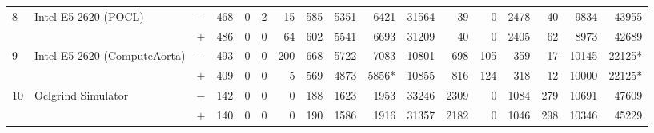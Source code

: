 \begin{tabular}{lll | rrrrrrr | rrrrrrr }
\hline
\multirow{ 2}{*}{8} & \multirow{ 2}{*}{Intel E5-2620 (POCL)} & $-$ & 468 & 0 & 2 & 15 & 585 & 5351 & 6421       & 31564 & 39 & 0 & 2478 & 40 & 9834 & 43955 \\& & $+$ & 486 & 0 & 0 & 64 & 602 & 5541 & 6693 & 31209 & 40 & 0 & 2405 & 62 & 8973 & 42689 \\
\hline
\multirow{ 2}{*}{9} & \multirow{ 2}{*}{Intel E5-2620 (ComputeAorta)} & $-$ & 493 & 0 & 0 & 200 & 668 & 5722 & 7083       & 10801 & 698 & 105 & 359 & 17 & 10145 & 22125* \\& & $+$ & 409 & 0 & 0 & 5 & 569 & 4873 & 5856* & 10855 & 816 & 124 & 318 & 12 & 10000 & 22125* \\
\hline
\multirow{ 2}{*}{10} & \multirow{ 2}{*}{Oclgrind Simulator} & $-$ & 142 & 0 & 0 & 0 & 188 & 1623 & 1953       & 33246 & 2309 & 0 & 1084 & 279 & 10691 & 47609 \\& & $+$ & 140 & 0 & 0 & 0 & 190 & 1586 & 1916 & 31357 & 2182 & 0 & 1046 & 298 & 10346 & 45229 \\
  \bottomrule
\end{tabular}

